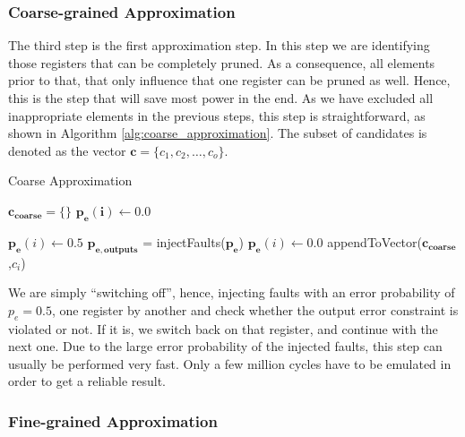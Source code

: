 \documentclass[conference]{IEEEtran}
\begin{document}
\subsubsection{Coarse-grained Approximation}
The third step is the first approximation step. In this step we are identifying those registers that can be completely pruned. As a consequence, all elements prior to that, that only influence that one register can be pruned as well. Hence, this is the step that will save most power in the end. As we have excluded all inappropriate elements in the previous steps, this step is straightforward, as shown in Algorithm \ref{alg:coarse_approximation}. The subset of candidates is denoted as the vector $\mathbf{c} = \{c_1,c_2,\ldots,c_{o}\}$.
\begin{algorithm}
  \caption{Coarse Approximation}\label{alg:coarse_approximation}
  \begin{algorithmic}[1]
    \State $\mathbf{c_{coarse}} = \{\}$
    \State $\mathbf{p_e(i)} \gets 0.0$
    \EndFor

    \State $\mathbf{p_e}(i) \gets 0.5$
    \State $\mathbf{p_{e,outputs}}$ = injectFaults($\mathbf{p_e}$)
    \State $\mathbf{p_e}(i) \gets 0.0$
    \Else
    \State appendToVector($\mathbf{c_{coarse}}$,$c_i$)

    \EndIf
    \EndFor

    \EndProcedure
  \end{algorithmic}
\end{algorithm}
We are simply ``switching off'', hence, injecting faults with an error probability of $p_e=0.5$, one register by another and check whether the output error constraint is violated or not. If it is, we switch back on that register, and continue with the next one. Due to the large error probability of the injected faults, this step can usually be performed very fast. Only a few million cycles have to be emulated in order to get a reliable result.
\subsubsection{Fine-grained Approximation}
\end{document}
